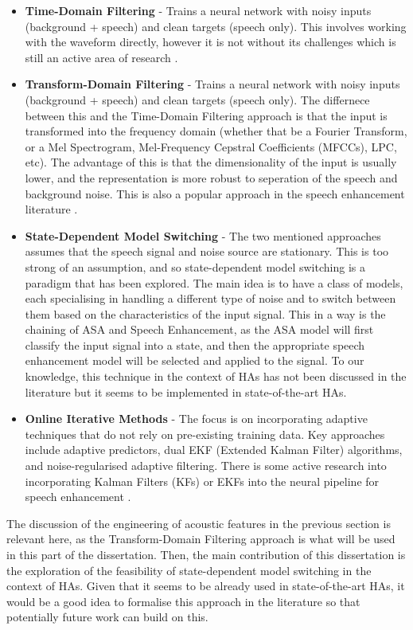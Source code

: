 \documentclass[logo,bsc,singlespacing,parskip,online]{infthesis}
\begin{document}
\begin{itemize}
   \item \textbf{Time-Domain Filtering} - Trains a neural network with noisy inputs (background + speech) and clean targets (speech only). 
   This involves working with the waveform directly, however it is not without its challenges which is still an active area of research \citep{saleem_time_2024}.
   \item \textbf{Transform-Domain Filtering} - Trains a neural network with noisy inputs (background + speech) and clean targets (speech only). 
   The differnece between this and the Time-Domain Filtering approach is that the input is transformed into the frequency domain 
   (whether that be a Fourier Transform, or a Mel Spectrogram, Mel-Frequency Cepstral Coefficients (MFCCs), LPC, etc). The advantage of this 
   is that the dimensionality of the input is usually lower, and the representation is more robust to seperation of the speech and background noise.
   This is also a popular approach in the speech enhancement literature \citep{hou_local_2023}.
   \item \textbf{State-Dependent Model Switching} - The two mentioned approaches assumes that the speech signal and noise source are stationary. 
   This is too strong of an assumption, and so state-dependent model switching is a paradigm that has been explored. The main idea is 
   to have a class of models, each specialising in handling a different type of noise and to switch between them based on the 
   characteristics of the input signal. This in a way is the chaining of ASA and Speech Enhancement, as the ASA model will 
   first classify the input signal into a state, and then the appropriate speech enhancement model will be selected and applied to the signal.
   To our knowledge, this technique in the context of HAs has not been discussed in the literature but it 
   seems to be implemented in state-of-the-art HAs. 
   \item \textbf{Online Iterative Methods} - The focus is on incorporating adaptive techniques that do not rely on pre-existing 
   training data. Key approaches include adaptive predictors, dual EKF (Extended Kalman Filter) algorithms, and noise-regularised adaptive filtering.
   There is some active research into incorporating Kalman Filters (KFs) or EKFs into the neural pipeline for speech enhancement \citep{Xue2020NeuralKF, Mellahi2023SpeechEU}.
\end{itemize}
The discussion of the engineering of acoustic features in the previous section is relevant here, as the Transform-Domain Filtering approach
is what will be used in this part of the dissertation. 
Then, the main contribution of this dissertation is the exploration of 
the feasibility of state-dependent model switching in the context of HAs. 
Given that it seems to be already used in state-of-the-art HAs, it 
would be a good idea to formalise this approach in the literature 
so that potentially future work can build on this.
\end{document}
